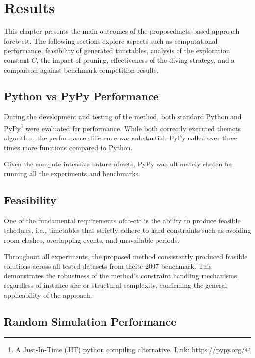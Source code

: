 \chapter{Results}

\label{Results}

This chapter presents the main outcomes of the proposed\ac{mcts}-based approach for\ac{cb-ctt}. The following sections explore aspects such as computational performance, feasibility of generated timetables, analysis of the exploration constant \(C\), the impact of pruning, effectiveness of the diving strategy, and a comparison against benchmark competition results.

\section{Python vs PyPy Performance}

During the development and testing of the method, both standard Python and PyPy\footnote{A Just-In-Time (JIT) python compiling alternative. Link: \url{https://pypy.org/}} were evaluated for performance. While both correctly executed the\ac{mcts} algorithm, the performance difference was substantial. PyPy called over three times more functions compared to Python.

Given the compute-intensive nature of\ac{mcts}, PyPy was ultimately chosen for running all the experiments and benchmarks.

\section{Feasibility}

One of the fundamental requirements of\ac{cb-ctt} is the ability to produce feasible schedules, i.e., timetables that strictly adhere to hard constraints such as avoiding room clashes, overlapping events, and unavailable periods.

Throughout all experiments, the proposed method consistently produced feasible solutions across all tested datasets from the\ac{itc-2007} benchmark. This demonstrates the robustness of the method's constraint handling mechanisms, regardless of instance size or structural complexity, confirming the general applicability of the approach.

\section{Random Simulation Performance}

